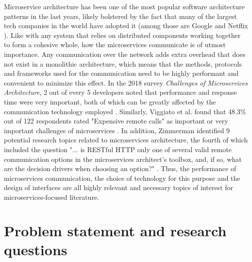 Microservice architecture has been one of the most popular software architecture patterns in the last years, likely bolstered by the fact that many of the largest tech companies in the world have adopted it (among those are Google \cite{googlemicroservices} and Netflix \cite{netflixmicroservices}). Like with any system that relies on distributed components working together to form a cohesive whole, how the microservices communicate is of utmost importance. Any communication over the network adds extra overhead that does not exist in a monolithic architecture, which means that the methods, protocols and frameworks used for the communication need to be highly performant and convenient to minimize this effect. In the 2018 survey \textit{Challenges of Microservices Architecture}, 2 out of every 5 developers noted that performance and response time were very important, both of which can be greatly affected by the communication technology employed \cite{ghofrani2018challenges}. Similarly, Viggiato et al. found that 48.3\% out of 122 respondents rated "Expensive remote calls" as important or very important challenges of microservices \cite{viggiato2018microservices}. In addition, Zimmerman identified 9 potential research topics related to microservices architecture, the fourth of which included the question "... is RESTful HTTP only one of several valid remote communication options in the microservices architect's toolbox, and, if so, what are the decision drivers when choosing an option?" \cite{zimmermann2016microservices}. Thus, the performance of microservices communication, the choice of technology for this purpose and the design of interfaces are all highly relevant and necessary topics of interest for microservices-focused literature.

\section{Problem statement and research questions}

